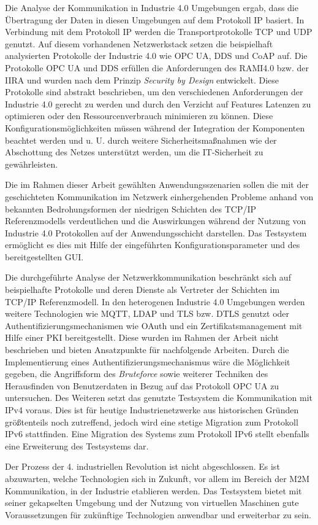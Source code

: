 Die Analyse der Kommunikation in Industrie 4.0 Umgebungen ergab, dass die Übertragung der Daten in diesen Umgebungen auf dem Protokoll \ac{IP} basiert. In Verbindung mit dem Protokoll \ac{IP} werden die Transportprotokolle \ac{TCP} und \ac{UDP} genutzt. Auf diesem vorhandenen Netzwerkstack setzen die beispielhaft analysierten Protokolle der Industrie 4.0 wie \ac{OPC UA}, \ac{DDS} und \ac{CoAP} auf. Die Protokolle \ac{OPC UA} und \ac{DDS} erfüllen die Anforderungen des \ac{RAMI4.0} bzw. der \ac{IIRA} und wurden nach dem Prinzip \textit{Security by Design} entwickelt. Diese Protokolle sind abstrakt beschrieben, um den verschiedenen Anforderungen der Industrie 4.0 gerecht zu werden und durch den Verzicht auf Features Latenzen zu optimieren oder den Ressourcenverbrauch minimieren zu können. Diese Konfigurationsmöglichkeiten müssen während der Integration der Komponenten beachtet werden und u. U. durch weitere Sicherheitsmaßnahmen wie der Abschottung des Netzes unterstützt werden, um die \ac{IT}-Sicherheit zu gewährleisten.

Die im Rahmen dieser Arbeit gewählten Anwendungsszenarien sollen die mit der geschichteten Kommunikation im Netzwerk einhergehenden Probleme anhand von bekannten Bedrohungsformen der niedrigen Schichten des \ac{TCP}/\ac{IP} Referenzmodells verdeutlichen und die Auswirkungen während der Nutzung von Industrie 4.0 Protokollen auf der Anwendungsschicht darstellen. Das Testsystem ermöglicht es dies mit Hilfe der eingeführten Konfigurationsparameter und des bereitgestellten \ac{GUI}.

Die durchgeführte Analyse der Netzwerkkommunikation beschränkt sich auf beispielhafte Protokolle und deren Dienste als Vertreter der Schichten im \ac{TCP}/\ac{IP} Referenzmodell. In den heterogenen Industrie 4.0 Umgebungen werden weitere Technologien wie \ac{MQTT}, \ac{LDAP} und \ac{TLS} bzw. \ac{DTLS} genutzt oder Authentifizierungsmechanismen wie \ac{OAuth} und ein Zertifikatsmanagement mit Hilfe einer \ac{PKI} bereitgestellt. Diese wurden im Rahmen der Arbeit nicht beschrieben und bieten Ansatzpunkte für nachfolgende Arbeiten. Durch die Implementierung eines Authentifizierungsmechanismus wäre die Möglichkeit gegeben, die Angriffsform des \textit{Bruteforce} sowie weiterer Techniken des Herausfinden von Benutzerdaten in Bezug auf das Protokoll \ac{OPC UA} zu untersuchen. Des Weiteren setzt das genutzte Testsystem die Kommunikation mit \ac{IP}v4 voraus. Dies ist für heutige Industrienetzwerke aus historischen Gründen größtenteils noch zutreffend, jedoch wird eine stetige Migration zum Protokoll \ac{IP}v6 stattfinden. Eine Migration des Systems zum Protokoll \ac{IP}v6 stellt ebenfalls eine Erweiterung des Testsystems dar.

Der Prozess der 4. industriellen Revolution ist nicht abgeschlossen. Es ist abzuwarten, welche Technologien sich in Zukunft, vor allem im Bereich der \ac{M2M} Kommunikation, in der Industrie etablieren werden. Das Testsystem bietet mit seiner gekapselten Umgebung und der Nutzung von virtuellen Maschinen gute Voraussetzungen für zukünftige Technologien anwendbar und erweiterbar zu sein.
